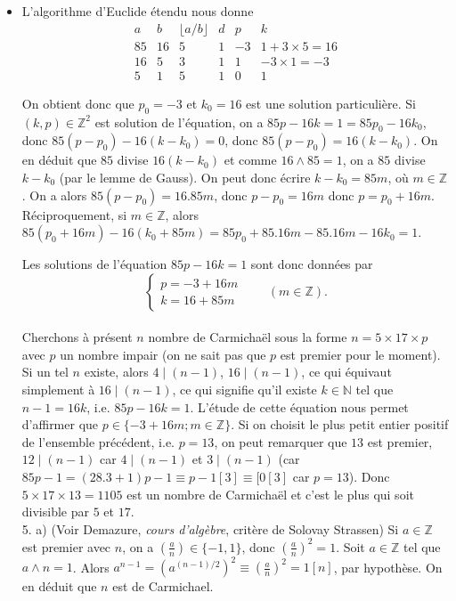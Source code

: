 \documentclass[11pt,a4paper]{article}
\newcommand{\Z}{\mathbb{Z}}
\begin{document}
\begin{itemize}
Donc un nombre de Carmichaël admet au moins $3$ facteurs premiers.  
 \\
\item[$4.$] L'algorithme d'Euclide étendu nous donne 
$$\begin{array}{c|c|c|c|c|c}
a & b &  \lfloor a/b \rfloor & d & p & k\\
\hline
85 & 16 & 5 & 1 & -3 & 1+3\times 5=16 \\
\hline
16 & 5 & 3 & 1 & 1 & -3 \times 1=-3 \\
\hline
5 & 1 & 5 & 1 & 0 & 1 
\end{array} $$

On obtient donc que $p_0=-3$ et $k_0=16$ est une solution particulière. Si $(k,p)\in \Z^2$ est solution de l'équation, on a $85p-16k=1=85 p_0-16k_0$, donc $85(p-p_0)-16(k-k_0)=0$, donc $85(p-p_0)=16(k-k_0)$.  On en déduit que $85$ divise $16(k-k_0)$ et comme $16\wedge 85=1$, on a $85$ divise $k-k_0$ (par le lemme de Gauss). On peut donc écrire $k-k_0=85m$, où $m\in \Z$. On a alors $85(p-p_0)=16.85m$, donc $p-p_0=16m$ donc $p=p_0+16m$. Réciproquement, si $m\in \Z$, alors $85(p_0+16m)-16(k_0+85m)=85p_0+85.16m-85.16m-16k_0=1$.
 
Les solutions de l'équation $85p - 16k = 1$ sont donc données par 
$$\left \{ \begin{array}{l}
p=-3+16 m \\
k=16+85 m
\end{array} \right.  \qquad (m  \in \mathbb{Z})  . $$\\
Cherchons à présent $n$ nombre de Carmichaël sous la forme $n=5 \times 17 \times p$ avec $p$ un nombre impair (on ne sait pas que $p$ est premier pour le moment). Si un tel $n$ existe, alors $4 \mid (n-1)$, $16 \mid (n-1)$, ce qui équivaut simplement à $16 \mid (n-1)$, ce qui signifie qu'il existe $k\in \mathbb{N}$ tel que $n-1=16k$, i.e. $85p-16k=1$. L'étude de cette équation nous permet d'affirmer que $p \in \{ -3+16 m ; m\in \mathbb{Z}  \}$. Si on choisit le plus petit entier positif de l'ensemble précédent, i.e. $p=13$, on peut remarquer que $13$ est premier, $12 \mid (n-1)$ car $4 \mid (n-1)$ et $3 \mid (n-1)$ (car $85p-1=(28.3+1)p-1\equiv p-1[3]\equiv[0[3]$ car $p=13$).
Donc $5 \times 17 \times 13=1105$ est un nombre de Carmichaël et c'est le plus qui soit divisible par $5$ et $17$.\\


5. a) (Voir Demazure, \textit{cours d'algèbre}, critère de Solovay Strassen) Si $a\in \Z$ est premier avec $n$, on a $\left(\frac{a}{n}\right)\in \{-1,1\}$, donc $\left(\frac{a}{n}\right)^2=1$. Soit $a\in \Z$ tel que $a\wedge n=1$. Alors $a^{n-1}=(a^{(n-1)/2})^2\equiv \left(\frac{a}{n}\right)^2=1[n]$, par hypothèse. On en déduit que $n$ est de Carmichael.


\end{itemize}
\end{document}
